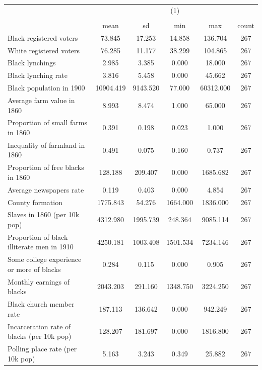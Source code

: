 {
\def\sym#1{\ifmmode^{#1}\else\(^{#1}\)\fi}
\begin{tabular}{l*{1}{ccccc}}
\hline\hline
                    &\multicolumn{5}{c}{(1)}                                         \\
                    &\multicolumn{5}{c}{}                                            \\
                    &        mean&          sd&         min&         max&       count\\
\hline
Black registered voters&      73.845&      17.253&      14.858&     136.704&         267\\
White registered voters&      76.285&      11.177&      38.299&     104.865&         267\\
Black lynchings     &       2.985&       3.385&       0.000&      18.000&         267\\
Black lynching rate &       3.816&       5.458&       0.000&      45.662&         267\\
Black population in 1900&   10904.419&    9143.520&      77.000&   60312.000&         267\\
Average farm value in 1860&       8.993&       8.474&       1.000&      65.000&         267\\
Proportion of small farms in 1860&       0.391&       0.198&       0.023&       1.000&         267\\
Inequality of farmland in 1860&       0.491&       0.075&       0.160&       0.737&         267\\
Proportion of free blacks in 1860&     128.188&     209.407&       0.000&    1685.682&         267\\
Average newspapers rate&       0.119&       0.403&       0.000&       4.854&         267\\
County formation    &    1775.843&      54.276&    1664.000&    1836.000&         267\\
Slaves in 1860 (per 10k pop)&    4312.980&    1995.739&     248.364&    9085.114&         267\\
Proportion of black illiterate men in 1910&    4250.181&    1003.408&    1501.534&    7234.146&         267\\
Some college experience or more of blacks&       0.284&       0.115&       0.000&       0.905&         267\\
Monthly earnings of blacks&    2043.203&     291.160&    1348.750&    3224.250&         267\\
Black church member rate&     187.113&     136.642&       0.000&     942.249&         267\\
Incarceration rate of blacks (per 10k pop)&     128.207&     181.697&       0.000&    1816.800&         267\\
Polling place rate (per 10k pop)&       5.163&       3.243&       0.349&      25.882&         267\\
\hline\hline
\end{tabular}
}
